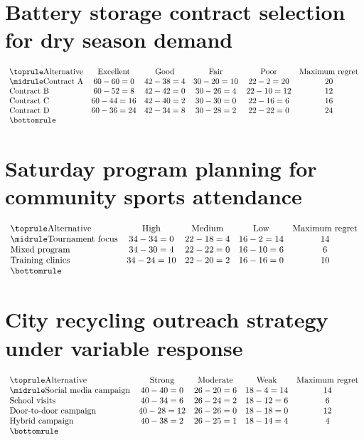 \section{Battery storage contract selection for dry season demand}
\[\begin{array}{lccccc}
			\toprule
			\text{Alternative} & \text{Excellent} & \text{Good} & \text{Fair} & \text{Poor} & \text{Maximum regret}\\
			\midrule
			\text{Contract A} & 60-60=0 & 42-38=4 & 30-20=10 & 22-2=20 & 20\\
			\text{Contract B} & 60-52=8 & 42-42=0 & 30-26=4 & 22-10=12 & 12\\
			\text{Contract C} & 60-44=16 & 42-40=2 & 30-30=0 & 22-16=6 & 16\\
			\text{Contract D} & 60-36=24 & 42-34=8 & 30-28=2 & 22-22=0 & 24\\
			\bottomrule
		\end{array}\]

\section{Saturday program planning for community sports attendance}
\[\begin{array}{lcccc}
			\toprule
			\text{Alternative} & \text{High} & \text{Medium} & \text{Low} & \text{Maximum regret}\\
			\midrule
			\text{Tournament focus} & 34-34=0 & 22-18=4 & 16-2=14 & 14\\
			\text{Mixed program} & 34-30=4 & 22-22=0 & 16-10=6 & 6\\
			\text{Training clinics} & 34-24=10 & 22-20=2 & 16-16=0 & 10\\
			\bottomrule
		\end{array}\]

\section{City recycling outreach strategy under variable response}
\[\begin{array}{lcccc}
			\toprule
			\text{Alternative} & \text{Strong} & \text{Moderate} & \text{Weak} & \text{Maximum regret}\\
			\midrule
			\text{Social media campaign} & 40-40=0 & 26-20=6 & 18-4=14 & 14\\
			\text{School visits} & 40-34=6 & 26-24=2 & 18-12=6 & 6\\
			\text{Door-to-door campaign} & 40-28=12 & 26-26=0 & 18-18=0 & 12\\
			\text{Hybrid campaign} & 40-38=2 & 26-25=1 & 18-14=4 & 4\\
			\bottomrule
		\end{array}\]

